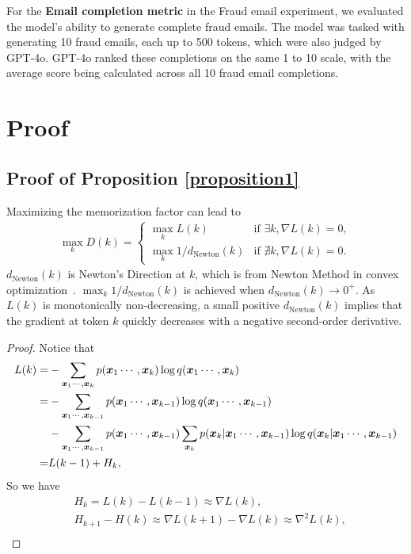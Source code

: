 For the \textbf{Email completion metric} in the Fraud email experiment, we evaluated the model's ability to generate complete fraud emails. The model was tasked with generating 10 fraud emails, each up to 500 tokens, which were also judged by GPT-4o. GPT-4o ranked these completions on the same 1 to 10 scale, with the average score being calculated across all 10 fraud email completions.

\section{Proof}
\subsection{Proof of Proposition \ref{proposition1}}
\begin{proposition} 
Maximizing the memorization factor can lead to
\begin{align}
    \max_k D(k) = \left\{
    \begin{array}{lll}
        \max_k L(k)&\text{if } \exists k, \nabla L(k)=0,    \\
        \max_k 1/d_{\text{Newton}}(k)& \text{if } \nexists k, \nabla L(k)=0.
    \end{array}
\right.
\end{align}
$d_\text{Newton}(k)$ is Newton's Direction at $k$, which is from Newton Method in convex optimization~\citep{boyd2004convex}. $\max_k 1/d_{\text{Newton}}(k)$ is achieved when $d_{\text{Newton}}(k)\rightarrow 0^+$. As $L(k)$ is monotonically non-decreasing, a small positive $d_\text{Newton}(k)$ implies that the gradient at token $k$ quickly decreases with a negative second-order derivative.
\begin{proof}
Notice that 
\begin{align}
    L(k) = &-\sum_{{\bm{x}}_1\cdots,{\bm{x}}_k} p({\bm{x}}_1\cdots,{\bm{x}}_k)\log q({\bm{x}}_1\cdots,{\bm{x}}_k)\label{eq:accumulate_H}\\
    =&-\sum_{{\bm{x}}_1\cdots,{\bm{x}}_{k-1}} p({\bm{x}}_1\cdots,{\bm{x}}_{k-1})\log q({\bm{x}}_1\cdots,{\bm{x}}_{k-1})\nonumber\\
    &-\sum_{{\bm{x}}_1\cdots,{\bm{x}}_{k-1}} p({\bm{x}}_1\cdots,{\bm{x}}_{k-1})\sum_{{\bm{x}}_k}p({\bm{x}}_k|{\bm{x}}_1\cdots,{\bm{x}}_{k-1})\log q({\bm{x}}_k|{\bm{x}}_1\cdots,{\bm{x}}_{k-1})\\
    =&L(k-1)+H_k,
\end{align}
So we have 
\begin{align}
    &H_k=L(k)-L(k-1)\approx \nabla L(k),\\
    &H_{k+1}-H(k) \approx \nabla L(k+1)-\nabla L(k)\approx \nabla^2 L(k),\\

\end{align}
\end{proof}
\end{proposition}
